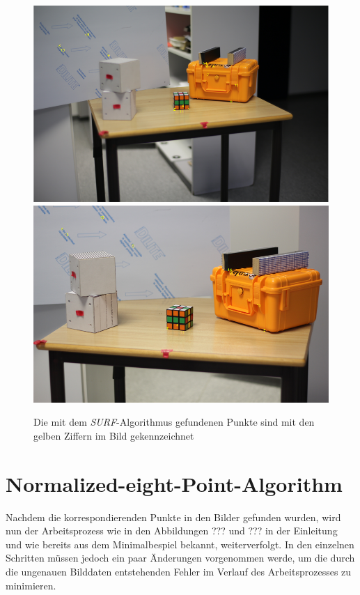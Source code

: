\begin{figure}[!htb]
	\includegraphics[width=\linewidth]{images/PointsDetectedLeft.png}
	\label{fig:awesome_image1}
	\endminipage\hfill
	\includegraphics[width=\linewidth]{images/PointsDetectedRight.png}
	\label{fig:awesome_image2}
	\endminipage\hfill
	\caption{Die mit dem \textit{SURF}-Algorithmus gefundenen Punkte sind mit den gelben Ziffern im Bild gekennzeichnet}
\end{figure}


\section{Normalized-eight-Point-Algorithm}

Nachdem die korrespondierenden Punkte in den Bilder gefunden wurden, wird nun der Arbeitsprozess wie in den Abbildungen ??? und ??? in der Einleitung und wie bereits aus dem Minimalbespiel bekannt, weiterverfolgt. In den einzelnen Schritten müssen jedoch ein paar Änderungen vorgenommen werde, um die durch die ungenauen Bilddaten entstehenden Fehler im Verlauf des Arbeitsprozesses zu minimieren. 


